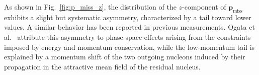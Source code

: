 As shown in Fig.~\ref{fig:p_miss_z}, the distribution of the $z$-component of $\mathbf{p}_{\text{miss}}$ exhibits a slight but systematic asymmetry, characterized by a tail toward lower values. A similar behavior has been reported in previous measurements. Ogata et al.~\cite{ogata2015asymmetry} attribute this asymmetry to phase-space effects arising from the constraints imposed by energy and momentum conservation, while the low-momentum tail is explained by a momentum shift of the two outgoing nucleons induced by their propagation in the attractive mean field of the residual nucleus.
%

